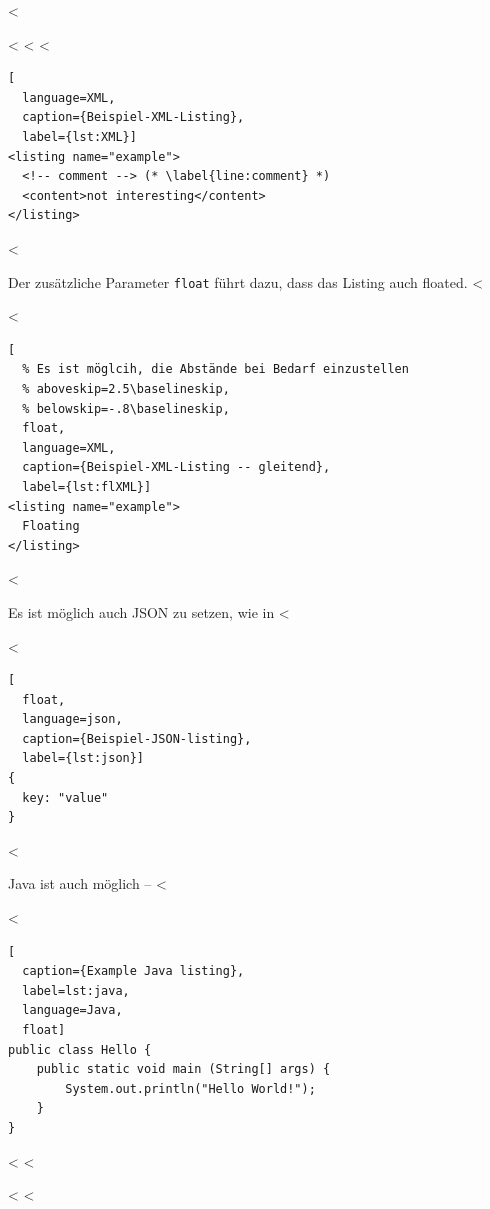 <%

<%
<%
<%

\begin{lstlisting}[
  language=XML,
  caption={Beispiel-XML-Listing},
  label={lst:XML}]
<listing name="example">
  <!-- comment --> (* \label{line:comment} *)
  <content>not interesting</content>
</listing>
\end{lstlisting}
<%

Der zusätzliche Parameter \verb+float+ führt dazu, dass das Listing auch floated.
<%

<%
\begin{lstlisting}[
  % Es ist möglcih, die Abstände bei Bedarf einzustellen
  % aboveskip=2.5\baselineskip,
  % belowskip=-.8\baselineskip,
  float,
  language=XML,
  caption={Beispiel-XML-Listing -- gleitend},
  label={lst:flXML}]
<listing name="example">
  Floating
</listing>
\end{lstlisting}
<%

Es ist möglich auch JSON zu setzen, wie in <%

<%
\begin{lstlisting}[
  float,
  language=json,
  caption={Beispiel-JSON-listing},
  label={lst:json}]
{
  key: "value"
}
\end{lstlisting}
<%

Java ist auch möglich -- <%

<%
\begin{lstlisting}[
  caption={Example Java listing},
  label=lst:java,
  language=Java,
  float]
public class Hello {
    public static void main (String[] args) {
        System.out.println("Hello World!");
    }
}
\end{lstlisting}
<%
<%

<%
<%

